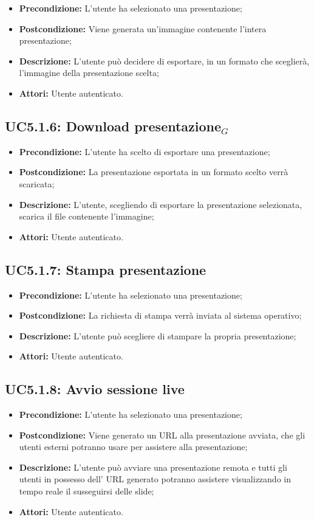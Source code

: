 \begin{itemize}
	\item \textbf{Precondizione:} L'utente ha selezionato una presentazione;
	\item \textbf{Postcondizione:} Viene generata un'immagine contenente l'intera presentazione;
	\item \textbf{Descrizione:} L'utente può decidere di esportare, in un formato che sceglierà, l'immagine della presentazione scelta;
	\item \textbf{Attori:} Utente autenticato.
\end{itemize}
\subsection{ UC5.1.6: Download presentazione$_G$}

\begin{itemize}
	\item \textbf{Precondizione:} L'utente ha scelto di esportare una presentazione;
	\item \textbf{Postcondizione:} La presentazione esportata in un formato scelto verrà scaricata;
	\item \textbf{Descrizione:} L'utente, scegliendo di esportare la presentazione selezionata, scarica il file contenente l'immagine;
	\item \textbf{Attori:} Utente autenticato.
\end{itemize}
\subsection{ UC5.1.7: Stampa presentazione }

\begin{itemize}
	\item \textbf{Precondizione:} L'utente ha selezionato una presentazione;
	\item \textbf{Postcondizione:} La richiesta di stampa verrà inviata al sistema operativo;
	\item \textbf{Descrizione:} L'utente può scegliere di stampare la propria presentazione;
	\item \textbf{Attori:} Utente autenticato.
\end{itemize}
\subsection{ UC5.1.8: Avvio sessione live}

\begin{itemize}
	\item \textbf{Precondizione:} L'utente ha selezionato una presentazione;
	\item \textbf{Postcondizione:} Viene generato un URL alla presentazione avviata, che gli utenti esterni potranno usare per assistere alla presentazione;
	\item \textbf{Descrizione:} L'utente può avviare una presentazione remota e tutti gli utenti in possesso dell' URL generato potranno assistere visualizzando in tempo reale il susseguirsi delle slide;
	\item \textbf{Attori:} Utente autenticato.
\end{itemize}

